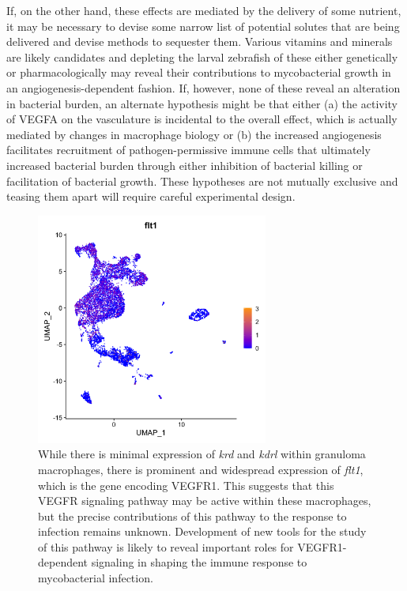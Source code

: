 If, on the other hand, these effects are mediated by the delivery of some nutrient, it may be necessary to devise some narrow list of potential solutes that are being delivered and devise methods to sequester them. Various vitamins and minerals are likely candidates and depleting the larval zebrafish of these either genetically or pharmacologically may reveal their contributions to mycobacterial growth in an angiogenesis\hyp{}dependent fashion. If, however, none of these reveal an alteration in bacterial burden, an alternate hypothesis might be that either (a) the activity of VEGFA on the vasculature is incidental to the overall effect, which is actually mediated by changes in macrophage biology or (b) the increased angiogenesis facilitates recruitment of pathogen\hyp{}permissive immune cells that ultimately increased bacterial burden through either inhibition of bacterial killing or facilitation of bacterial growth. These hypotheses are not mutually exclusive and teasing them apart will require careful experimental design.

\begin{figure}
\centering
\includegraphics[height=3in]{images/wtCombo_flt1_GEPlot.png}
\caption[scRNA-seq expression data for \textit{flt1}]{While there is minimal expression of \textit{krd} and \textit{kdrl} within granuloma macrophages, there is prominent and widespread expression of \textit{flt1}, which is the gene encoding VEGFR1. This suggests that this VEGFR signaling pathway may be active within these macrophages, but the precise contributions of this pathway to the response to infection remains unknown. Development of new tools for the study of this pathway is likely to reveal important roles for VEGFR1-dependent signaling in shaping the immune response to mycobacterial infection.}
\label{figure:scflt1}
\end{figure}

